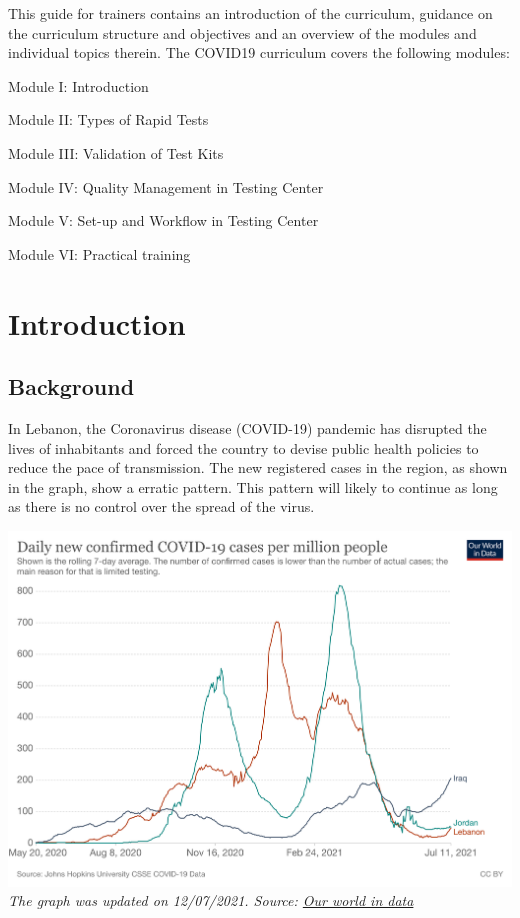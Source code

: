 \documentclass[
]{book}
\begin{document}
This guide for trainers contains an introduction of the curriculum,
guidance on the curriculum structure and objectives and an overview of
the modules and individual topics therein. The COVID19 curriculum covers
the following modules:

Module I: Introduction

Module II: Types of Rapid Tests

Module III: Validation of Test Kits

Module IV: Quality Management in Testing Center

Module V: Set-up and Workflow in Testing Center

Module VI: Practical training

\hypertarget{intro}{%
\chapter{Introduction}\label{intro}}

\hypertarget{background}{%
\section{Background}\label{background}}

In Lebanon, the Coronavirus disease (COVID-19) pandemic has disrupted
the lives of inhabitants and forced the country to devise public health
policies to reduce the pace of transmission. The new registered cases in the region, as shown in the graph, show a erratic pattern. This pattern will likely to continue as long as there is no control over the spread of the virus.

\includegraphics{images/covid19_ME_210712.png}
\emph{The graph was updated on 12/07/2021. Source: \href{https://ourworldindata.org/coronavirus}{Our world in data} }
\end{document}
